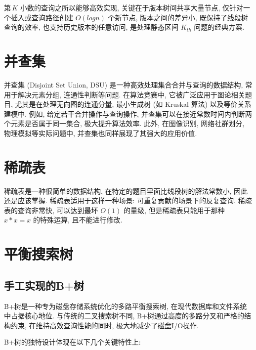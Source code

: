 \documentclass[a4paper]{ctexbook}
\begin{document}
第 $K$ 小数的查询之所以能够高效实现, 关键在于版本树间共享大量节点, 仅针对一个插入或查询路径创建 $O(log n)$ 个新节点, 版本之间的差异小, 既保持了线段树查询的效率, 也支持历史版本的任意访问, 是处理静态区间 $K_{th}$ 问题的经典方案.



\section{并查集}

并查集 (Disjoint Set Union, DSU) 是一种高效处理集合合并与查询的数据结构, 常用于解决元素分组, 连通性判断等问题. 在算法竞赛中, 它被广泛应用于图论相关题目, 尤其是在处理无向图的连通分量, 最小生成树 (如 Kruskal 算法) 以及等价关系建模中. 例如, 给定若干合并操作与查询操作, 并查集可以在接近常数时间内判断两个元素是否属于同一集合, 极大提升算法效率. 此外, 在图像识别, 网络社群划分, 物理模拟等实际问题中, 并查集也同样展现了其强大的应用价值.



\section{稀疏表}

稀疏表是一种很简单的数据结构, 在特定的题目里面比线段树的解法常数小, 因此还是应该掌握. 稀疏表适用于这样一种场景: 可重复贡献的场景下的反复查询. 稀疏表的查询非常快, 可以达到最坏 $O(1)$ 的量级, 但是稀疏表只能用于那种 $x*x=x$ 的特殊运算, 且不能进行修改.



\section{平衡搜索树}

\subsection*{手工实现的B+树}

B+树是一种专为磁盘存储系统优化的多路平衡搜索树, 在现代数据库和文件系统中占据核心地位. 与传统的二叉搜索树不同, B+树通过高度的多路分叉和严格的结构约束, 在维持高效查询性能的同时, 极大地减少了磁盘I/O操作.

B+树的独特设计体现在以下几个关键特性上:
\end{document}
